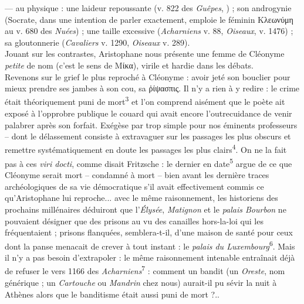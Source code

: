 \documentclass[12pt]{book}%
\newcommand{\italique}[1]{\textit{#1}}%
\newcommand{\grec}[1]{#1}%
\newcommand{\marqueur}[1]{\textsuperscript{#1}}%
\newenvironment{groupe}{%
\pstart%
\ledgroup%
}{%
\pend %
}%
\begin{document}
\begin{pages}
\begin{Leftside}
\begin{groupe}
{{— au physique : une laideur repoussante (v. 822 des \italique{Guêpes}, ) ; son androgynie (Socrate, dans une intention de parler exactement, emploie le féminin \grec{Κλεωνύμη} au v. 680 des \italique{Nuées}) ; une taille excessive (\italique{Acharniens} v. 88, \italique{Oiseaux}, v. 1476) ; sa gloutonnerie (\italique{Cavaliers} v. 1290, \italique{Oiseaux} v. 289).\\
Jouant sur les contrastes, Aristophane nous présente une femme de Cléonyme \italique{petite} de nom (c'est le sens de \grec{Μίκα}), virile et hardie dans les débats.\\
Revenons sur le grief le plus reproché à Cléonyme : avoir jeté son bouclier pour mieux prendre ses jambes à son cou, sa \grec{ῥίψασπις}. Il n'y a rien à y redire : le crime était théoriquement puni de mort\marqueur{3} et l'on comprend aisément que le poète ait exposé à l'opprobre publique le couard qui avait encore l'outrecuidance de venir palabrer après son forfait. Exégèse par trop simple pour nos éminents professeurs – dont le délassement consiste à extravaguer sur les passages les plus obscurs et remettre systématiquement en doute les passages les plus clairs\marqueur{4}. On ne la fait pas à ces \italique{viri docti}, comme disait Fritzsche : le dernier en date\marqueur{5} argue de ce que Cléonyme serait mort – condamné à mort – bien avant les dernière traces archéologiques de sa vie démocratique s'il avait effectivement commis ce qu'Aristophane lui reproche... avec le même raisonnement, les historiens des prochains millénaires déduiront que l'\italique{Élysée}, \italique{Matignon} et le \italique{palais Bourbon} ne pouvaient désigner que des prisons au vu des canailles hors-la-loi qui les fréquentaient ; prisons flanquées, semblera-t-il, d'une maison de santé pour ceux dont la panse menacait de crever à tout instant : le \italique{palais du Luxembourg}\marqueur{6}. Mais il n'y a pas besoin d'extrapoler : le même raisonnement intenable entraînait déjà de refuser le vers 1166 des \italique{Acharniens}\marqueur{7} : comment un bandit (un \italique{Oreste}, nom générique ; un \italique{Cartouche} ou \italique{Mandrin} chez nous) aurait-il pu sévir la nuit à Athènes alors que le banditisme était aussi puni de mort ?..
}}
\end{groupe}
\end{Leftside}
\end{pages}
\end{document}
